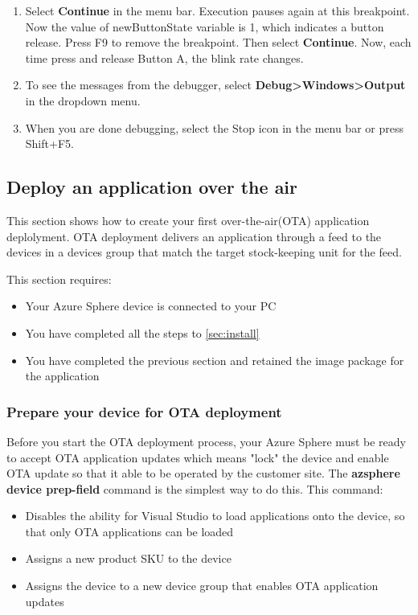 \begin{enumerate}
    \item Select \textbf{Continue} in the menu bar. Execution pauses again at this breakpoint. Now the value of newButtonState variable is 1, which indicates a button release. Press F9 to remove the breakpoint. Then select \textbf{Continue}. Now, each time press and release Button A, the blink rate changes.
    
    \item To see the messages from the debugger, select \textbf{Debug>Windows>Output} in the dropdown menu.
    
    \item When you are done debugging, select the Stop icon in the menu bar or press Shift+F5.
\end{enumerate}

\subsection{Deploy an application over the air}
This section shows how to create your first over-the-air(OTA) application deplolyment. OTA deployment delivers an application through a feed to the devices in a devices group that match the target stock-keeping unit for the feed.

This section requires:
\begin{itemize}
    \item Your Azure Sphere device is connected to your PC
    \item You have completed all the steps to \autoref{sec:install}
    \item You have completed the previous section and retained the image package for the application
\end{itemize}

\subsubsection{Prepare your device for OTA deployment}
Before you start the OTA deployment process, your Azure Sphere must be ready to accept OTA application updates which means "lock" the device and enable OTA update so that it able to be operated by the customer site. The \textbf{azsphere device prep-field} command is the simplest way to do this. This command:
\begin{itemize}
    \item Disables the ability for Visual Studio to load applications onto the device, so that only OTA applications can be loaded
    \item Assigns a new product SKU to the device
    \item Assigns the device to a new device group that enables OTA application updates
\end{itemize}

